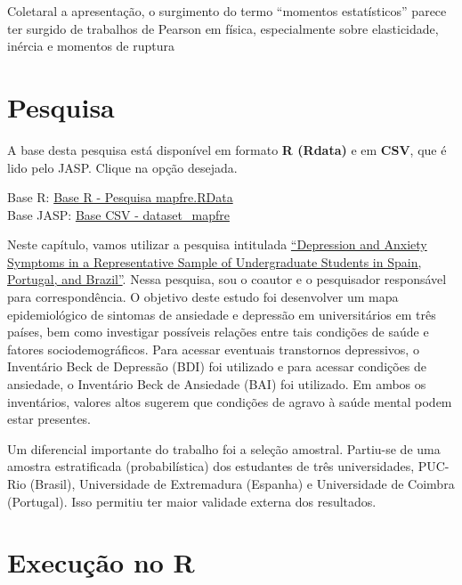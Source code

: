 \documentclass[
]{book}
\newenvironment{base}{
  \definecolor{shadecolor}{rgb}{0.764,0.992,0.686}  %
  \color{black}
  \begin{shaded}}
 {\end{shaded}}
\begin{document}
Coletaral a apresentação, o surgimento do termo ``momentos estatísticos'' parece ter surgido de trabalhos de Pearson em física, especialmente sobre elasticidade, inércia e momentos de ruptura \citep{David1998}

\hypertarget{pesquisa}{%
\section{Pesquisa}\label{pesquisa}}

\begin{base}
A base desta pesquisa está disponível em formato \textbf{R (Rdata)} e em \textbf{CSV}, que é lido pelo JASP. Clique na opção desejada.

Base R: \href{https://github.com/anovabr/mqt/raw/master/bases/Base\%20R\%20-\%20Pesquisa\%20mapfre.RData}{Base R - Pesquisa mapfre.RData}\\
Base JASP: \href{https://github.com/anovabr/mqt/raw/master/bases/bases_csv_jasp.zip}{Base CSV - dataset\_mapfre}

\end{base}

Neste capítulo, vamos utilizar a pesquisa intitulada \href{https://doi.org/10.1590/0102.3772e36412}{``Depression and Anxiety Symptoms in a Representative Sample of Undergraduate Students in Spain, Portugal, and Brazil''}. Nessa pesquisa, sou o coautor e o pesquisador responsável para correspondência. O objetivo deste estudo foi desenvolver um mapa epidemiológico de sintomas de ansiedade e depressão em universitários em três países, bem como investigar possíveis relações entre tais condições de saúde e fatores sociodemográficos. Para acessar eventuais transtornos depressivos, o Inventário Beck de Depressão (BDI) foi utilizado e para acessar condições de ansiedade, o Inventário Beck de Ansiedade (BAI) foi utilizado. Em ambos os inventários, valores altos sugerem que condições de agravo à saúde mental podem estar presentes.

Um diferencial importante do trabalho foi a seleção amostral. Partiu-se de uma amostra estratificada (probabilística) dos estudantes de três universidades, PUC-Rio (Brasil), Universidade de Extremadura (Espanha) e Universidade de Coimbra (Portugal). Isso permitiu ter maior validade externa dos resultados.

\hypertarget{execuuxe7uxe3o-no-r}{%
\section{Execução no R}\label{execuuxe7uxe3o-no-r}}
\end{document}
